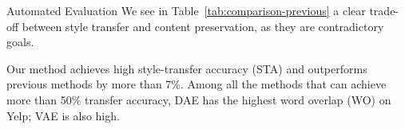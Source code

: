 \documentclass[final]{beamer}
\newlength{\onecolwid}
\newlength{\twocolwid}
\begin{document}
\begin{frame}[t]
\begin{columns}[t]
\begin{column}{\twocolwid}
\begin{columns}[t,totalwidth=\twocolwid]
\begin{column}{\onecolwid}

                \end{column} %

            \end{columns} %






            \begin{columns}[t,totalwidth=\twocolwid] %

                \begin{column}{\onecolwid} %

                    \begin{block}{Automated Evaluation}
                        We see in Table~\ref{tab:comparison-previous} a clear trade-off between style transfer and content preservation, as they are contradictory goals.

                        Our method achieves high style-transfer accuracy (STA) and outperforms previous methods by more than 7\%. Among all the methods that can achieve more than 50\% transfer accuracy, DAE has the highest word overlap (WO) on Yelp; VAE is also high.


\end{block}
\end{column}
\end{columns}
\end{column}
\end{columns}
\end{frame}
\end{document}

